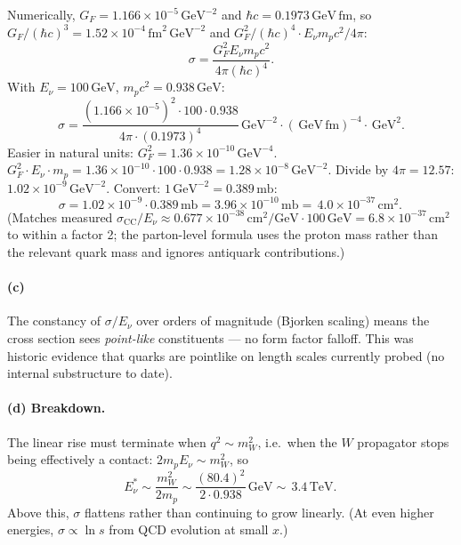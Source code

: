 \documentclass[11pt]{article}
\newcommand{\fm}{\,\mathrm{fm}}
\newcommand{\GeV}{\,\mathrm{GeV}}
\newcommand{\TeV}{\,\mathrm{TeV}}
\begin{document}
Numerically, $G_F=1.166\times 10^{-5}\GeV^{-2}$ and $\hbar c=0.1973\GeV\fm$, so $G_F/(\hbar c)^{3}=1.52\times 10^{-4}\fm^{2}\GeV^{-2}$ and $G_F^{2}/(\hbar c)^{4}\cdot E_\nu m_p c^{2}/4\pi$:
\[
\sigma=\frac{G_F^{2}E_\nu m_p c^{2}}{4\pi(\hbar c)^{4}}.
\]
With $E_\nu=100\GeV$, $m_p c^{2}=0.938\GeV$:
\[
\sigma=\frac{(1.166\times 10^{-5})^{2}\cdot 100\cdot 0.938}{4\pi\cdot(0.1973)^{4}}\GeV^{-2}\cdot(\GeV\fm)^{-4}\cdot\GeV^{2}.
\]
Easier in natural units: $G_F^{2}=1.36\times 10^{-10}\GeV^{-4}$. $G_F^{2}\cdot E_\nu\cdot m_p=1.36\times 10^{-10}\cdot 100\cdot 0.938=1.28\times 10^{-8}\GeV^{-2}$. Divide by $4\pi=12.57$: $1.02\times 10^{-9}\GeV^{-2}$. Convert: $1\GeV^{-2}=0.389\,\mathrm{mb}$:
\[
\sigma=1.02\times 10^{-9}\cdot 0.389\,\mathrm{mb}=3.96\times 10^{-10}\,\mathrm{mb}=\boxed{\,4.0\times 10^{-37}\,\mathrm{cm}^{2}.\,}
\]
(Matches measured $\sigma_\mathrm{CC}/E_\nu\approx 0.677\times 10^{-38}\,\mathrm{cm^{2}/GeV}\cdot 100\GeV=6.8\times 10^{-37}\,\mathrm{cm^{2}}$ to within a factor 2; the parton-level formula uses the proton mass rather than the relevant quark mass and ignores antiquark contributions.)

\paragraph{(c)} The constancy of $\sigma/E_\nu$ over orders of magnitude (Bjorken scaling) means the cross section sees \emph{point-like} constituents --- no form factor falloff. This was historic evidence that quarks are pointlike on length scales currently probed (no internal substructure to date).

\paragraph{(d) Breakdown.} The linear rise must terminate when $q^{2}\sim m_W^{2}$, i.e.\ when the $W$ propagator stops being effectively a contact: $2 m_p E_\nu\sim m_W^{2}$, so
\[
E_\nu^*\sim\frac{m_W^{2}}{2 m_p}\sim\frac{(80.4)^{2}}{2\cdot 0.938}\GeV\sim\boxed{\,3.4\TeV.\,}
\]
Above this, $\sigma$ flattens rather than continuing to grow linearly. (At even higher energies, $\sigma\propto\ln s$ from QCD evolution at small $x$.)
\end{document}
